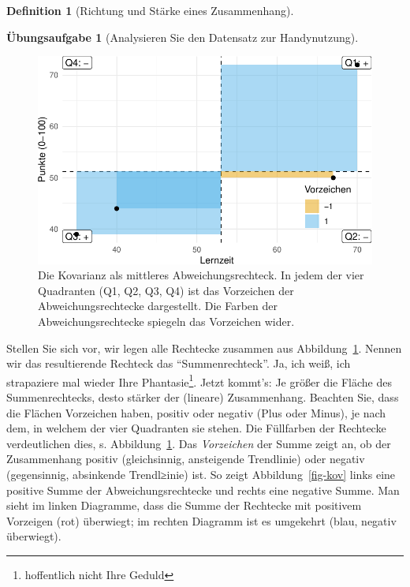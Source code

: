 \documentclass[
  a4paper,
  DIV=11]{scrreprt}
\theoremstyle{definition}
\newtheorem{exercise}{Übungsaufgabe}[chapter]
\theoremstyle{definition}
\theoremstyle{definition}
\newtheorem{definition}{Definition}[chapter]
\theoremstyle{remark}
\begin{document}
\begin{definition}[Richtung und Stärke eines
Zusammenhang]
\begin{exercise}[Analysieren Sie den Datensatz zur
Handynutzung]
\begin{figure}
{\includegraphics{070-zusammenhaenge_files/figure-pdf/fig-delta-rect-1.pdf}

}

\caption{\label{fig-delta-rect}Die Kovarianz als mittleres
Abweichungsrechteck. In jedem der vier Quadranten (Q1, Q2, Q3, Q4) ist
das Vorzeichen der Abweichungsrechtecke dargestellt. Die Farben der
Abweichungsrechtecke spiegeln das Vorzeichen wider.}

\end{figure}%

Stellen Sie sich vor, wir legen alle Rechtecke zusammen aus
Abbildung~\ref{fig-delta-rect}. Nennen wir das resultierende Rechteck
das ``Summenrechteck''. Ja, ich weiß, ich strapaziere mal wieder Ihre
Phantasie\footnote{hoffentlich nicht Ihre Geduld}. Jetzt kommt's: Je
größer die Fläche des Summenrechtecks, desto stärker der (lineare)
Zusammenhang. Beachten Sie, dass die Flächen Vorzeichen haben, positiv
oder negativ (Plus oder Minus), je nach dem, in welchem der vier
Quadranten sie stehen. Die Füllfarben der Rechtecke verdeutlichen dies,
s. Abbildung~\ref{fig-delta-rect}. Das \emph{Vorzeichen} der Summe zeigt
an, ob der Zusammenhang positiv (gleichsinnig, ansteigende Trendlinie)
oder negativ (gegensinnig, absinkende Trendl≥inie) ist. So zeigt
Abbildung~\ref{fig-kov} links eine positive Summe der
Abweichungsrechtecke und rechts eine negative Summe. Man sieht im linken
Diagramme, dass die Summe der Rechtecke mit positivem Vorzeigen (rot)
überwiegt; im rechten Diagramm ist es umgekehrt (blau, negativ
überwiegt).

\begin{figure}

\begin{minipage}{0.50\linewidth}


\end{minipage}
\end{figure}
\end{exercise}
\end{definition}
\end{document}
